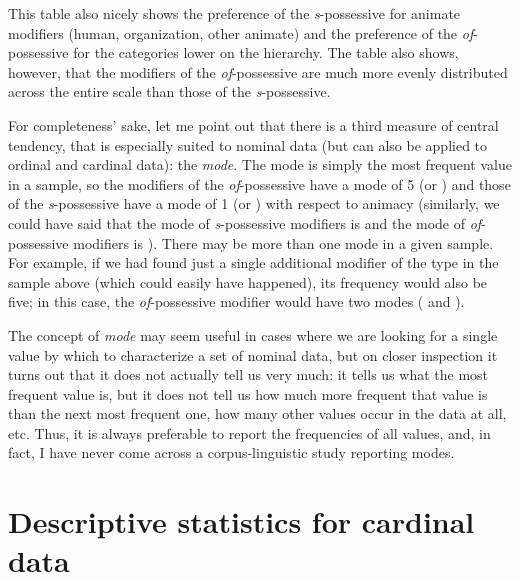 This table also nicely shows the preference of the \textit{s}-possessive  for animate  modifiers (human, organization, other animate) and the preference of the \textit{of}-possessive for the categories  lower on the hierarchy. The table also shows, however, that the modifiers of the \textit{of}-possessive are much more evenly distributed  across the entire   scale than those of the \textit{s}-possessive.

For completeness' sake, let me point out that there is a third measure of central tendency, that is especially suited to nominal  data (but can also be applied to ordinal  and cardinal  data): the \textit{mode}.  The mode is simply the most frequent value in a sample, so the modifiers of the \textit{of}-possessive  have a mode of 5 (or ) and those of the \textit{s}-possessive have a mode of 1 (or ) with respect to animacy  (similarly, we could have said that the mode of \textit{s}-possessive modifiers is  and the mode of \textit{of}-possessive modifiers is ). There may be more than one mode  in a given sample. For example, if we had found just a single additional modifier of the type  in the sample above (which could easily have happened), its frequency  would also be five; in this case, the \textit{of}-possessive  modifier would have two modes ( and  ).

The concept of \textit{mode}  may seem useful in cases where we are looking for a single value by which to characterize a set of nominal  data, but on closer inspection it turns out that it does not actually tell us very much: it tells us what the most frequent value is, but it does not tell us how much more frequent that value is than the next most frequent one, how many other values occur in the data at all, etc. Thus, it is always preferable to report the frequencies  of all values, and, in fact, I have never come across a corpus\hyp{}linguistic study reporting  modes.

\section{Descriptive statistics for cardinal data}
\label{sec:descriptivecardinal}

